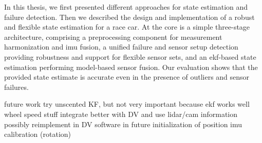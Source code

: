 In this thesis, we first presented different approaches for state estimation and failure detection. Then we described the design and implementation of a robust and flexible state estimation for a race car. At the core is a simple three-stage architecture, comprising a preprocessing component for measurement harmonization and \gls{imu} fusion, a unified failure and sensor setup detection providing robustness and support for flexible sensor sets, and an \gls{ekf}-based state estimation performing model-based sensor fusion. Our evaluation shows that the provided state estimate is accurate even in the presence of outliers and sensor failures.

future work
try unscented KF, but not very important because ekf works well
wheel speed stuff
integrate better with DV and use lidar/cam information
possibly reimplement in DV software in future
initialization of position
imu calibration (rotation)
